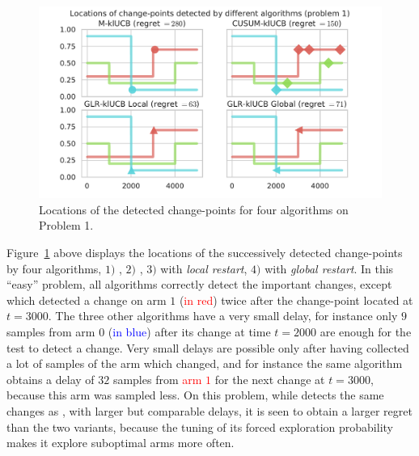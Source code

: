 \begin{figure}[h!]  %
    \centering
    \includegraphics[width=1.00\linewidth]{2-Chapters/6-Chapter/Images/Visualizing_locations_of_change_points_for_different_algorithms__4algs_Pb1.pdf}
    \caption{Locations of the detected change-points for four algorithms on Problem 1.}
    \label{fig:6:Visualizing_locations_of_change_points_for_different_algorithms__4algs_Pb1}
\end{figure}

Figure~\ref{fig:6:Visualizing_locations_of_change_points_for_different_algorithms__4algs_Pb1} above displays the locations of the successively detected change-points by four algorithms,
$1)$ \MklUCB,
$2)$ \CUSUMklUCB,
$3)$ \GLRklUCB{} with \emph{local restart},
$4)$ \GLRklUCB{} with \emph{global restart}.
In this ``easy'' problem, all algorithms correctly detect the important changes, except \CUSUM{} which detected a change on arm $1$ (\textcolor{red}{in red}) twice after the change-point located at $t=3000$.
The three other algorithms have a very small delay, for instance only $9$ samples from arm $0$ (\textcolor{blue}{in blue}) after its change at time $t=2000$ are enough for the \GLR{} test to detect a change.
Very small delays are possible only after having collected a lot of samples of the arm which changed, and for instance the same algorithm obtains a delay of $32$ samples from \textcolor{red}{arm $1$} for the next change at $t=3000$, because this arm was sampled less.
On this problem, while \MklUCB{} detects the same changes as \GLRklUCB, with larger but comparable delays, it is seen to obtain a larger regret than the two \GLR{} variants, because the tuning of its forced exploration probability makes it explore suboptimal arms more often.

